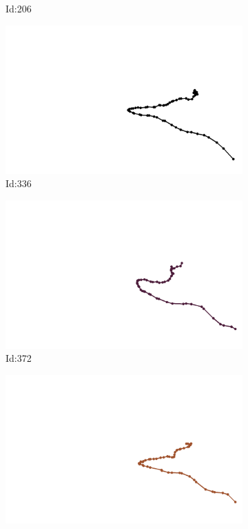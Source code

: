 \documentclass[12pt,twoside]{report}
\begin{document}
\begin{figure}
\begin{subfigure}[b]{0.20\textwidth}
\caption{Id:206}
\end{subfigure}
\begin{subfigure}[b]{0.20\textwidth}
\centering
\includegraphics[width=\textwidth]{../../trajectories/336.png}
\caption{Id:336}
\end{subfigure}
\begin{subfigure}[b]{0.20\textwidth}
\centering
\includegraphics[width=\textwidth]{../../trajectories/372.png}
\caption{Id:372}
\end{subfigure}
\begin{subfigure}[b]{0.20\textwidth}
\centering
\includegraphics[width=\textwidth]{../../trajectories/408.png}

\end{subfigure}
\end{figure}
\end{document}
